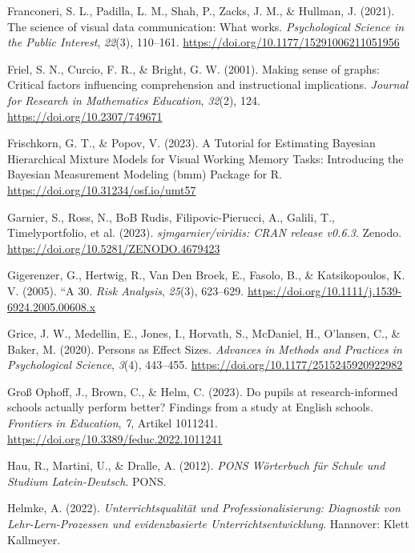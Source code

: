 \documentclass[
  jou,
  floatsintext,
  longtable,
  nolmodern,
  notxfonts,
  notimes,
  colorlinks=true,linkcolor=blue,citecolor=blue,urlcolor=blue]{apa7}
\newlength{\cslhangindent}
\newenvironment{CSLReferences}[2] %
 {\begin{list}{}{%
  \setlength{\itemindent}{0pt}
  \setlength{\leftmargin}{0pt}
  \setlength{\parsep}{0pt}
  \ifodd #1
   \setlength{\leftmargin}{\cslhangindent}
   \setlength{\itemindent}{-1\cslhangindent}
  \fi
  \setlength{\itemsep}{#2\baselineskip}}}
 {\end{list}}
\begin{document}
\begin{CSLReferences}{1}{0}
Franconeri, S. L., Padilla, L. M., Shah, P., Zacks, J. M., \& Hullman,
J. (2021). The science of visual data communication: What works.
\emph{Psychological Science in the Public Interest}, \emph{22}(3),
110--161. \url{https://doi.org/10.1177/15291006211051956}

Friel, S. N., Curcio, F. R., \& Bright, G. W. (2001). Making sense of
graphs: Critical factors influencing comprehension and instructional
implications. \emph{Journal for Research in Mathematics Education},
\emph{32}(2), 124. \url{https://doi.org/10.2307/749671}

Frischkorn, G. T., \& Popov, V. (2023). A Tutorial for Estimating
Bayesian Hierarchical Mixture Models for Visual Working Memory Tasks:
Introducing the Bayesian Measurement Modeling (bmm) Package for R.
\url{https://doi.org/10.31234/osf.io/umt57}

Garnier, S., Ross, N., BoB Rudis, Filipovic-Pierucci, A., Galili, T.,
Timelyportfolio, et al. (2023). \emph{sjmgarnier/viridis: CRAN release
v0.6.3}. Zenodo. \url{https://doi.org/10.5281/ZENODO.4679423}

Gigerenzer, G., Hertwig, R., Van Den Broek, E., Fasolo, B., \&
Katsikopoulos, K. V. (2005). {``}A 30. \emph{Risk Analysis},
\emph{25}(3), 623--629.
\url{https://doi.org/10.1111/j.1539-6924.2005.00608.x}

Grice, J. W., Medellin, E., Jones, I., Horvath, S., McDaniel, H.,
O'lansen, C., \& Baker, M. (2020). Persons as Effect Sizes.
\emph{Advances in Methods and Practices in Psychological Science},
\emph{3}(4), 443--455. \url{https://doi.org/10.1177/2515245920922982}

Groß Ophoff, J., Brown, C., \& Helm, C. (2023). Do pupils at
research-informed schools actually perform better? Findings from a study
at English schools. \emph{Frontiers in Education}, \emph{7}, Artikel
1011241. \url{https://doi.org/10.3389/feduc.2022.1011241}

Hau, R., Martini, U., \& Dralle, A. (2012). \emph{PONS Wörterbuch für
Schule und Studium Latein-Deutsch}. PONS.

Helmke, A. (2022). \emph{Unterrichtsqualität und Professionalisierung:
Diagnostik von Lehr-Lern-Prozessen und evidenzbasierte
Unterrichtsentwicklung}. Hannover: Klett Kallmeyer.


\end{CSLReferences}
\end{document}
